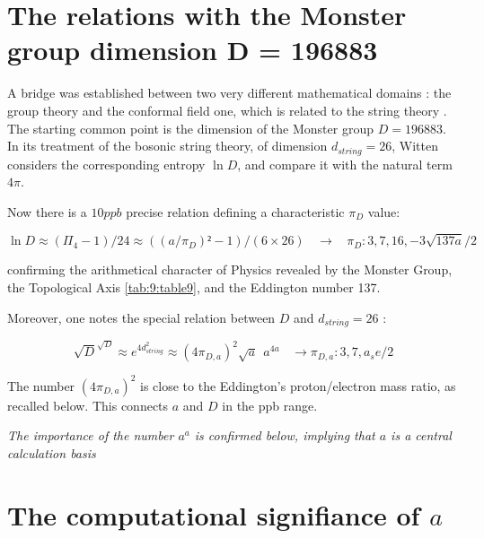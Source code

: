 \documentclass[a4paper,9pt]{article}
\begin{document}
 
 
 
 
 
 
 
 
 \section{The relations with the Monster group dimension D = 196883} 
 
A bridge was established between two very different mathematical domains : the group theory and the conformal field one, which is related to the string theory \cite{Frenkel}. The starting common point is the dimension of the Monster group $D = 196883$. In its treatment of the bosonic string theory, of dimension $d_{string} = 26$, Witten \cite{Witten} considers the corresponding entropy $\ln{D}$, and compare it with the natural term $4\pi$. 
   
Now there is a $10 ppb$ precise relation defining a characteristic $\pi_D$  value:
  
\begin{equation}
 \ln{D} \approx (\Pi_4 - 1)/24 \approx ((a/\pi_D)² - 1)/(6\times 26) ~~~~\rightarrow  ~~~~ \pi_D : 3,7,16,-3\sqrt{137a}/2
\end{equation}  
 

confirming the arithmetical character of Physics revealed by the Monster Group, the Topological Axis \ref{tab:9:table9}, and the Eddington number 137.


Moreover, one notes the special relation between $D$ and $d_{string} = 26$ :

\begin{equation}
 \sqrt D^{\sqrt D} \approx e^{4d_{string}^2} \approx (4\pi_{D,a})^2 \sqrt a~~ a^{4a} ~~~~ \rightarrow \pi_{D,a} : 3,7,a_se/2
\end{equation}  

The number $(4\pi_{D,a})^2$ is close to the Eddington's proton/electron mass ratio, as recalled below. This connects $a$ and $D$ in the ppb range. 


\textit{The importance of the number $a^a$ is confirmed below, implying that $a$ is a central calculation basis}



     
   
   \section{The computational signifiance of $a$}
   
\end{document}
